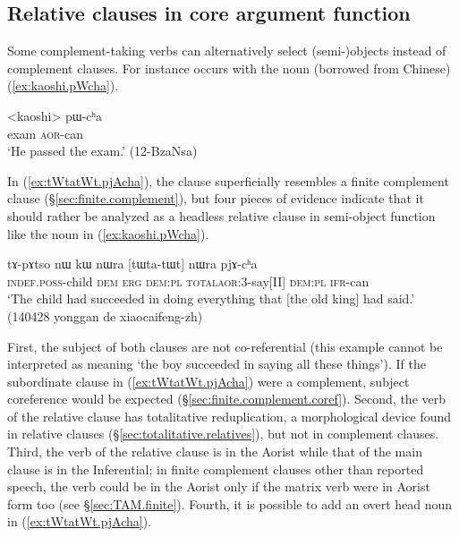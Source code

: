 \subsection{Relative clauses in core argument function}   \label{sec:relative.core.arg}
Some com\-ple\-ment-taking verbs can alternatively select (semi-)objects instead of complement clauses. For instance  occurs with the noun  (borrowed from Chinese) (\ref{ex:kaoshi.pWcha}).

\begin{exe}
	\ex \label{ex:kaoshi.pWcha}
	\gll   <kaoshi> pɯ-cʰa  \\
	exam \textsc{aor}-can \\
	\glt `He passed the exam.' (12-BzaNsa)
\end{exe}

In (\ref{ex:tWtatWt.pjAcha}), the clause  superficially resembles a finite complement clause (§\ref{sec:finite.complement}), but four pieces of evidence indicate that it should rather be analyzed as a headless relative clause in semi-object function like the noun  in (\ref{ex:kaoshi.pWcha}).


\begin{exe}
	\ex \label{ex:tWtatWt.pjAcha}
	\gll  tɤ-pɤtso nɯ kɯ nɯra [tɯ\redp{}ta-tɯt] nɯra pjɤ-cʰa \\
	\textsc{indef}.\textsc{poss}-child \textsc{dem} \textsc{erg} \textsc{dem}:\textsc{pl} \textsc{total}\redp{}\textsc{aor}:3\flobv{}-say[II] \textsc{dem}:\textsc{pl} \textsc{ifr}-can \\
	\glt `The child had succeeded in doing everything that [the old king] had said.' (140428 yonggan de xiaocaifeng-zh)
\end{exe}

First, the subject of both clauses are not co-referential (this example cannot be interpreted as meaning `the boy succeeded in saying all these things'). If the subordinate clause in (\ref{ex:tWtatWt.pjAcha}) were a complement, subject coreference would be expected (§\ref{sec:finite.complement.coref}). Second, the verb of the relative clause has totalitative reduplication, a morphological device  found in relative clauses (§\ref{sec:totalitative.relatives}), but not in complement clauses. Third, the verb of the relative clause is in the Aorist while that of the main clause is in the Inferential; in finite complement clauses other than reported speech, the verb could be in the Aorist only if the matrix verb were in Aorist form too (see §\ref{sec:TAM.finite}). Fourth, it is possible to add an overt head noun in (\ref{ex:tWtatWt.pjAcha}).
  
